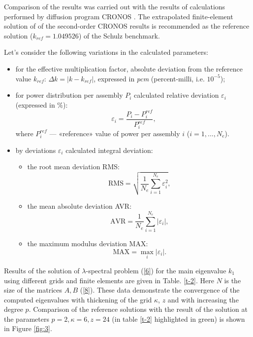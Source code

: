 \documentclass[runningheads,a4paper]{llncs}
\begin{document}
Comparison of the results was carried out with the results of calculations performed by diffusion program CRONOS \cite{cronos}. The extrapolated finite-element solution of of the second-order CRONOS results is recommended as the reference solution ($k_{ref} = 1.049526$) of the Schulz benchmark. 


Let's consider the following variations in the calculated parameters:
\begin{itemize}\itemsep1pt \parskip0pt 
\item for the effective multiplication factor, absolute deviation from the reference value $k_{ref}$: $\Delta k = |k - k_{ref}|$, expressed in \textit{pcm} (percent-milli, i.e. $10^{-5}$);
\item for power distribution per assembly $P_i$ calculated relative deviation $\varepsilon_i$ (expressed in \%):
\[
\varepsilon_i = \frac{P_i - P_i^{ref}}{P_i^{ref}},
\]
where $P_i^{ref}$ --- «reference» value of power per assembly $i$ ($i = 1,...,N_e$).
\item by deviations $\varepsilon_i$ calculated integral deviation:
\begin{itemize}\itemsep1pt \parskip0pt 
\item the root mean deviation RMS:
\[
\mathrm{RMS} = \sqrt{\frac{1}{N_e}\sum_{i=1}^{N_e} \varepsilon_i^2},
\]
\item the mean absolute deviation AVR:
\[
\mathrm{AVR} = \frac{1}{N_e}\sum_{i=1}^{N_e} \left\vert \varepsilon_i\right\vert,
\]
\item the maximum modulus deviation MAX:
\[
\mathrm{MAX} = \underset{i}{\max}\left\vert\varepsilon_i\right\vert.
\]
\end{itemize}
\end{itemize}

Results of the solution of $\lambda$-spectral problem (\ref{6}) for the main eigenvalue $k_1 $ using different grids and finite elements are given in Table. \ref{t-2}. Here $N$ is  the size of the matrices $A,B$ (\ref{8}). These data demonstrate the convergence of the computed eigenvalues with thickening of the grid $\kappa$, $z$ and with increasing the degree $p$. Comparison of the reference solutions with the result of the solution at the parameters $p=2, \kappa=6, z=24$ (in table \ref{t-2} highlighted in green) is shown in Figure \ref{fig:3}.
\end{document}
